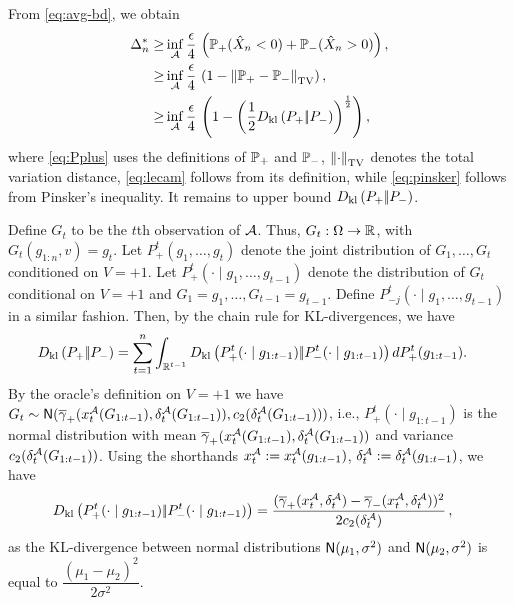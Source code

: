 From \eqref{eq:avg-bd}, we obtain
\begin{align}
\Delta_n^{*}  
  \ge & \inf_{\A} \dfrac{\epsilon }{4} \, \left(\P_{+}(\hat X_n < 0) + \P_{-}(\hat X_n > 0)\right), \label{eq:Pplus}\\
  \ge &\inf_{\A} \dfrac{\epsilon }{4} \,\left(1 - \tvnorm{\P_{+}- \P_{-}}\right), \label{eq:lecam}\\
  \ge &\inf_{\A} \dfrac{\epsilon }{4}  \,\left( 1 - \left(\frac12\dkl{P_{+}}{P_{-}}\right)^{\frac{1}{2}}\right), \label{eq:pinsker}
\end{align}
where 
 \eqref{eq:Pplus} uses the definitions of $\P_+$ and $\P_-$, $\tvnorm{\cdot}$ denotes the total variation distance,  
 \eqref{eq:lecam} follows from its definition, while \eqref{eq:pinsker} follows from Pinsker's inequality. 
It remains to upper bound $\dkl{P_{+}}{P_{-}}$.


Define $G_t$ to be the $t$th observation of $\A$. Thus, $G_t:\Omega \to \R$, with $G_t( g_{1:n}, v) = g_t$.
Let $P_+^t(g_1,\dots,g_t)$ denote the joint distribution of $G_1,\dots,G_t$ conditioned on $V=+1$.
Let $P_{+}^t(\cdot\mid g_1,\ldots,g_{t-1})$ denote the distribution of $G_t$ conditional on $V=+1$ and $G_1=g_1,\ldots,G_{t-1}=g_{t-1}$. Define  $P_{-j}^t(\cdot\mid g_1,\ldots,g_{t-1})$ in a similar fashion.
Then, by the chain rule for KL-divergences, we have
\begin{align}
\label{eq:dklchain}
&\dkl{P_{+}}{P_{-}}= \sum_{t=1}^n \int_{\R^{t-1}} \dkl{P_{+}^t(\cdot\mid g_{1:t-1})}{P_{-}^t(\cdot\mid g_{1:t-1})} d P_{+}^t( g_{1:t-1}).
\end{align}
By the oracle's definition on $V=+1$ we have
$G_t \sim  \normal(\overline{\gamma}_{+}(x^{\cA}_t(G_{1:t-1}),\delta_t^{\A}(G_{1:t-1})),c_2(\delta^{\A}_t(G_{1:t-1})))$, i.e., 
$P_{+}^t(\cdot\mid g_{1:t-1})$ is the normal distribution with mean 
$\overline{\gamma}_{+}(x^{\cA}_t(G_{1:t-1}),\delta^{\A}_t(G_{1:t-1}))$ and variance $c_2(\delta^{\A}_t(G_{1:t-1}))$.
Using the shorthands $x_t^{\A}:=x^{\A}_t(g_{1:t-1})$, $\delta_t^{\A}:=\delta^{\A}_t(g_{1:t-1})$,
we have
\begin{align*}
\dkl{P_{+}^t(\cdot\mid g_{1:t-1})}{P_{-}^t(\cdot\mid g_{1:t-1})}
& =\dfrac{(\overline{\gamma}_{+}(x_t^{\A},\delta_t^{\A}) - \overline{\gamma}_{-}(x_t^{\A},\delta_t^{\A}))^2}{2 c_2(\delta^{\A}_t)}\,,
\end{align*}
as the KL-divergence between normal distributions $\normal(\mu_1,\sigma^2)$ and $\normal(\mu_2,\sigma^2)$ is equal to $\dfrac{(\mu_1 - \mu_2)^2}{2 \sigma^2}$.

